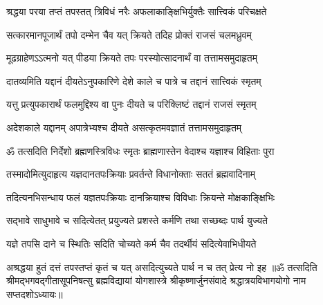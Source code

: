 \twolineshloka
{श्रद्धया परया तप्तं तपस्तत् त्रिविधं नरैः}
{अफलाकाङ्क्षिभिर्युक्तैः सात्त्विकं परिचक्षते}%

\twolineshloka
{सत्कारमानपूजार्थं तपो दम्भेन चैव यत्}
{क्रियते तदिह प्रोक्तं राजसं चलमध्रुवम्}%

\twolineshloka
{मूढग्राहेणऽऽत्मनो यत् पीडया क्रियते तपः}
{परस्योत्सादनार्थं वा तत्तामसमुदाहृतम्}%

\twolineshloka
{दातव्यमिति यद्दानं दीयतेऽनुपकारिणे}
{देशे काले च पात्रे च तद्दानं सात्त्विकं स्मृतम्}%

\twolineshloka
{यत्तु प्रत्युपकारार्थं फलमुद्दिश्य वा पुनः}
{दीयते च परिक्लिष्टं तद्दानं राजसं स्मृतम्}%

\twolineshloka
{अदेशकाले यद्दानम् अपात्रेभ्यश्च दीयते}
{असत्कृतमवज्ञातं तत्तामसमुदाहृतम्}%

\twolineshloka
{ॐ तत्सदिति निर्देशो ब्रह्मणस्त्रिविधः स्मृतः}
{ब्राह्मणास्तेन वेदाश्च यज्ञाश्च विहिताः पुरा}%

\twolineshloka
{तस्मादोमित्युदाहृत्य यज्ञदानतपःक्रियाः}
{प्रवर्तन्ते विधानोक्ताः सततं ब्रह्मवादिनाम्}%

\twolineshloka
{तदित्यनभिसन्धाय फलं यज्ञतपःक्रियाः}
{दानक्रियाश्च विविधाः क्रियन्ते मोक्षकाङ्क्षिभिः}%

\twolineshloka
{सद्भावे साधुभावे च सदित्येतत् प्रयुज्यते}
{प्रशस्ते कर्मणि तथा सच्छब्दः पार्थ युज्यते}%

\twolineshloka
{यज्ञे तपसि दाने च स्थितिः सदिति चोच्यते}
{कर्म चैव तदर्थीयं सदित्येवाभिधीयते}%

\twolineshloka
{अश्रद्धया हुतं दत्तं तपस्तप्तं कृतं च यत्}
{असदित्युच्यते पार्थ न च तत् प्रेत्य नो इह}%
{॥ॐ तत्सदिति श्रीमद्भगवद्गीतासूपनिषत्सु ब्रह्मविद्यायां योगशास्त्रे श्रीकृष्णार्जुनसंवादे श्रद्धात्रयविभागयोगो नाम सप्तदशोऽध्यायः॥}
